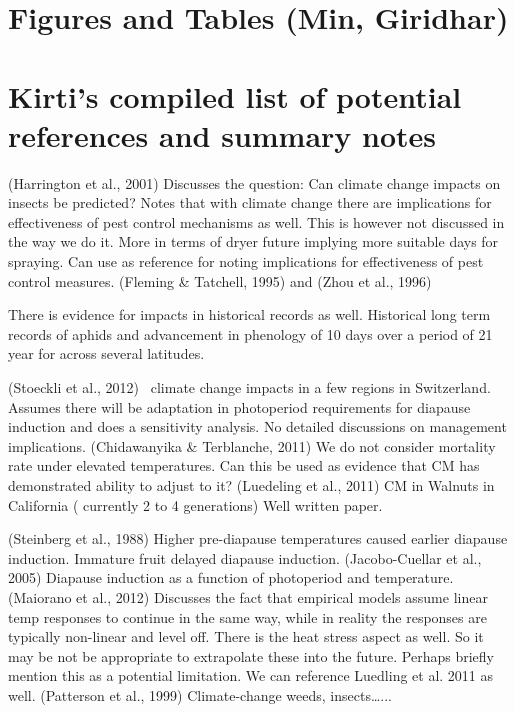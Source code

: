 \documentclass[12pt]{article}
\theoremstyle{plain}
\theoremstyle{definition}
\theoremstyle{definition}
\begin{document}
\section{Figures and Tables (Min, Giridhar)}

\section{Kirti’s compiled list of potential references and summary notes}
(Harrington et al., 2001) Discusses the question: Can 
climate change impacts on insects be predicted?  
Notes that with climate change there are implications 
for effectiveness of pest control mechanisms as well. 
This is however  not discussed in the way we do it. More 
in terms of dryer future implying more suitable days for 
spraying. Can use as reference for noting implications 
for effectiveness of pest control measures.
(Fleming \& Tatchell, 1995) and (Zhou et al., 1996)  

There is evidence for impacts in historical records as 
well. Historical long term records of aphids and 
advancement in phenology of 10 days over a period 
of 21 year for across several latitudes.

(Stoeckli et al., 2012)~\cite{Stoeckli} climate change impacts in a 
few regions in Switzerland. Assumes there will be 
adaptation in photoperiod requirements for diapause
 induction and does a sensitivity analysis. No 
 detailed discussions on management implications.
(Chidawanyika \& Terblanche, 2011) We do not 
consider mortality rate under elevated temperatures. 
Can this be used as evidence that CM has 
demonstrated ability to adjust to it?
(Luedeling et al., 2011) CM in Walnuts in 
California ( currently 2 to 4 generations) 
Well written paper.

(Steinberg et al., 1988) Higher pre-diapause 
temperatures caused earlier diapause induction. 
Immature fruit delayed diapause induction. 
(Jacobo-Cuellar et al., 2005) Diapause induction 
as a function of photoperiod and temperature.
(Maiorano et al., 2012) Discusses the fact that 
empirical models assume linear temp responses 
to continue in the same way, while in reality the 
responses are typically non-linear and level off. 
There is the heat stress aspect as well. So it 
may be not be appropriate to extrapolate these 
into the future. Perhaps briefly mention this as 
a potential limitation. We can reference 
Luedling et al. 2011 as well.
(Patterson et al., 1999) Climate-change 
weeds, insects…...
\end{document}
